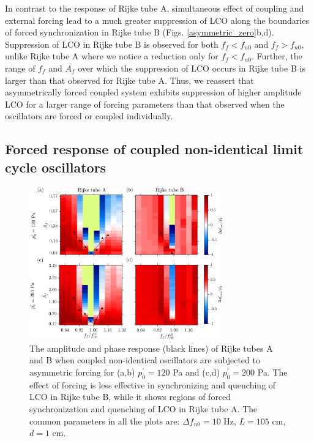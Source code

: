 \documentclass[%
preprint,
 amsmath,amssymb,
 aps,
 pra,
]{revtex4-2}
\begin{document}
In contrast to the response of Rijke tube A, simultaneous effect of coupling and external forcing lead to a much greater suppression of LCO along the boundaries of forced synchronization in Rijke tube B (Figs. \ref{asymmetric_zero}b,d). Suppression of LCO in Rijke tube B is observed for both $f_f<f_{n0}$ and $f_f>f_{n0}$, unlike Rijke tube A where we notice a reduction only for $f_f<f_{n0}$. Further, the range of $f_f$ and $\bar{A_f}$ over which the suppression of LCO occurs in Rijke tube B is larger than that observed for Rijke tube A. Thus, we reassert that asymmetrically forced coupled system exhibits suppression of higher amplitude LCO for a larger range of forcing parameters than that observed when the oscillators are forced or coupled individually.

\subsection{Forced response of coupled non-identical limit cycle oscillators}
\label{Results:4}

\begin{figure}[t!]
\centering
\includegraphics[width=0.75\textwidth]{fig7.jpg}
\caption{\label{10Hz_nonidentical}The amplitude and phase response (black lines) of Rijke tubes A and B when coupled non-identical oscillators are subjected to asymmetric forcing for (a,b) $p^\prime_{0}=120$ Pa and (c,d) $p^\prime_{0} = 200$ Pa. The effect of forcing is less effective in synchronizing and quenching of LCO in Rijke tube B, while it shows regions of forced synchronization and quenching of LCO in Rijke tube A. The common parameters in all the plots are: $\Delta f_{n0}=10$ Hz, $L=105$ cm, $d= 1$ cm.}
\end{figure}
\end{document}

